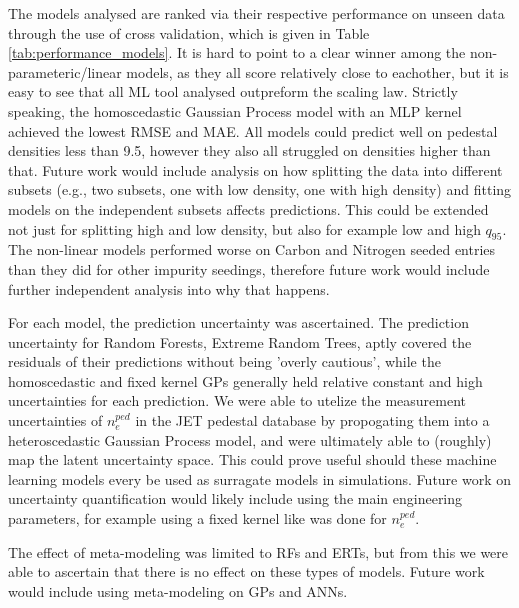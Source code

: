 \documentclass[a4paper, twoside, final, 12pt]{article}
\begin{document}
{The models analysed are ranked via their respective performance on unseen data through the use of cross validation, which is given in Table \ref{tab:performance_models}.
It is hard to point to a clear winner among the non-parameteric/linear models, as they all score relatively close to eachother, but it is easy to see that all ML tool analysed outpreform the scaling law. Strictly speaking, the homoscedastic Gaussian Process model with an MLP kernel achieved the lowest RMSE and MAE. All models could predict well on pedestal densities less than 9.5, however they also all struggled on densities higher than that. Future work would include analysis on how splitting the data into different subsets (e.g., two subsets, one with low density, one with high density) and fitting models on the independent subsets affects predictions. This could be extended not just for splitting high and low density, but also for example low and high $q_{95}$. The non-linear models performed worse on Carbon and Nitrogen seeded entries than they did for other impurity seedings, therefore future work would include further independent analysis into why that happens.  

For each model, the prediction uncertainty was ascertained. The prediction uncertainty for Random Forests, Extreme Random Trees, aptly covered the residuals of their predictions without being 'overly cautious', while the homoscedastic and fixed kernel GPs generally held relative constant and high uncertainties for each prediction. We were able to utelize the measurement uncertainties of $n_e^{ped}$ in the JET pedestal database by propogating them into a heteroscedastic Gaussian Process model, and were ultimately able to (roughly) map the latent uncertainty space. This could prove useful should these machine learning models every be used as surragate models in simulations. Future work on uncertainty quantification would likely include using the main engineering parameters, for example using a fixed kernel like was done for $n_e^{ped}$. 

The effect of meta-modeling was limited to RFs and ERTs, but from this we were able to ascertain that there is no effect on these types of models. Future work would include using meta-modeling on GPs and ANNs.  



}
\end{document}

